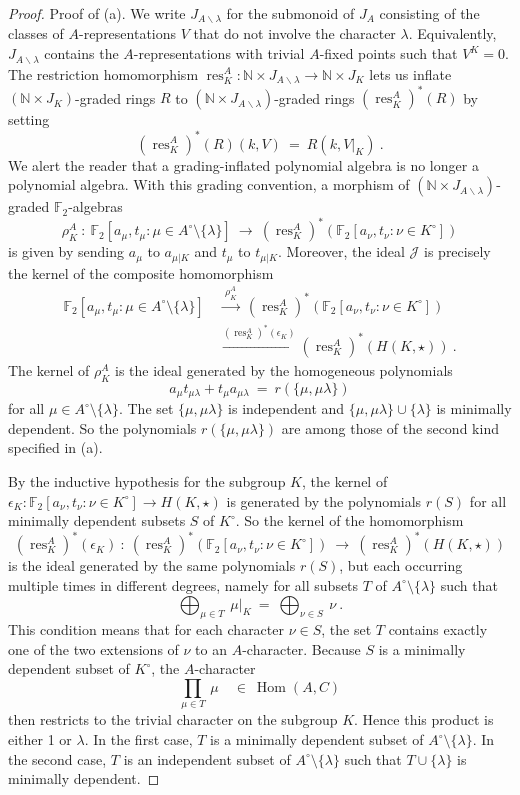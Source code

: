 \documentclass{amsart}[12pt]
\DeclareMathOperator{\Hom}{Hom}
\DeclareMathOperator{\res}{res}
\newcommand{\mF}{{\mathbb F}}
\newcommand{\mN}{{\mathbb N}}
\newcommand{\Jc}{{\mathcal J}}
\newcommand{\xra}{\xrightarrow}
\renewcommand{\to}{\longrightarrow}
\numberwithin{equation}{section}
\theoremstyle{definition}
\begin{document}
\begin{proof}
  Proof of (a). We write $J_{A\backslash\lambda}$ for the submonoid of $J_A$ consisting of
  the classes of $A$-representations $V$ that do not involve the character $\lambda$.
  Equivalently, $J_{A\backslash\lambda}$ contains the $A$-representations
  with trivial $A$-fixed points such that $V^K=0$.
  The restriction homomorphism $\res^A_K:\mN\times J_{A\backslash\lambda}\to\mN\times J_K$
  lets us inflate $(\mN\times J_K)$-graded rings $R$
  to $(\mN\times J_{A\backslash\lambda})$-graded rings $(\res^A_K)^*(R)$ by setting
  \[ (\res^A_K)^*(R)(k,V)\ = \ R(k,V|_K)\ . \]
  We alert the reader that a grading-inflated polynomial algebra
  is no longer a polynomial algebra.
  With this grading convention, a morphism
  of $(\mN\times J_{A\backslash\lambda})$-graded $\mF_2$-algebras
  \[  \rho^A_K\ : \   \mF_2[a_\mu,t_\mu\colon  \mu\in A^\circ\setminus\{\lambda\}] \ \to \
  (\res^A_K)^*\left(  \mF_2[a_\nu,t_\nu\colon  \nu\in K^\circ]  \right) \]
  is given by sending $a_\mu$ to $a_{\mu|K}$ and $t_\mu$ to $t_{\mu|K}$. 
  Moreover, the ideal $\Jc$ is precisely the kernel of the composite homomorphism
  \begin{align*}
    \mF_2[a_\mu,t_\mu\colon  \mu\in A^\circ\setminus\{\lambda\}] \
    &\xra{\ \rho^A_K\ } \
      (\res^A_K)^*\left(  \mF_2[a_\nu,t_\nu\colon  \nu\in K^\circ]  \right)\\
    &\xra{(\res^A_K)^*(\epsilon_K)} (\res^A_K)^* (  H(K,\star) ) \ .
  \end{align*}
  The kernel of $\rho^A_K$ is the ideal generated by the homogeneous polynomials
  \[
    a_\mu t_{\mu\lambda} + t_\mu a_{\mu\lambda}\ = \ r(\{\mu,\mu\lambda\})
  \]
  for all $\mu\in A^\circ\setminus\{\lambda\}$.
  The set $\{\mu,\mu\lambda\}$ is independent
  and $\{\mu,\mu\lambda\}\cup\{\lambda\}$ is minimally dependent.
  So the polynomials $r(\{\mu,\mu\lambda\})$ are among those of the second kind specified in (a).

  By the inductive hypothesis for the subgroup $K$,
  the kernel of $\epsilon_K: \mF_2[a_\nu,t_\nu\colon  \nu\in K^\circ] \to H(K,\star)$
  is generated by the polynomials $r(S)$ for all minimally dependent subsets $S$
  of $K^\circ$. So the kernel of the homomorphism
  \[  (\res^A_K)^*(\epsilon_K)\ : \ 
    (\res^A_K)^*\left(  \mF_2[a_\nu,t_\nu\colon  \nu\in K^\circ]  \right)
    \ \to \  (\res^A_K)^* (  H(K,\star) ) \]
  is the ideal generated by the same polynomials $r(S)$, but each occurring
  multiple times in different degrees, namely for all subsets $T$ of
  $A^\circ\setminus\{\lambda\}$ such that 
  \[ {\bigoplus}_{\mu\in T}\ \mu|_K \ = \ {\bigoplus}_{\nu\in S}\ \nu\ . \]
  This condition means that for each character $\nu\in S$, the set $T$
  contains exactly one of the two extensions of $\nu$ to an $A$-character.
  Because $S$ is a minimally dependent subset of $K^\circ$, the $A$-character
  \[ {\prod}_{\mu\in T}\ \mu \quad \in \ \Hom(A,C)\]
  then restricts to the trivial character on the subgroup $K$.
  Hence this product is either 1 or $\lambda$.
  In the first case, $T$ is a minimally dependent subset of $A^\circ\setminus\{\lambda\}$.
  In the second case, $T$ is an independent subset of $A^\circ\setminus\{\lambda\}$
  such that $T\cup\{\lambda\}$ is minimally dependent.


\end{proof}
\end{document}
